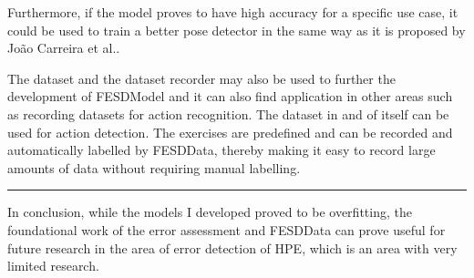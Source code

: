 Furthermore, if the model proves to have high accuracy for a specific use case, it could be used to train a better pose detector in the same way as it is proposed by Jo\~ao Carreira et al.\cite{IterativeErrorFeedback}.

The dataset and the dataset recorder may also be used to further the development of FESDModel and it can also find application in other areas such as recording datasets for action recognition. The dataset in and of itself can be used for action detection. The exercises are predefined and can be recorded and automatically labelled by FESDData, thereby making it easy to record large amounts of data without requiring manual labelling.

\noindent\rule[0.5pt]{\linewidth}{1pt}


In conclusion, while the models I developed proved to be overfitting, the foundational work of the error assessment and FESDData can prove useful for future research in the area of error detection of HPE, which is an area with very limited research.